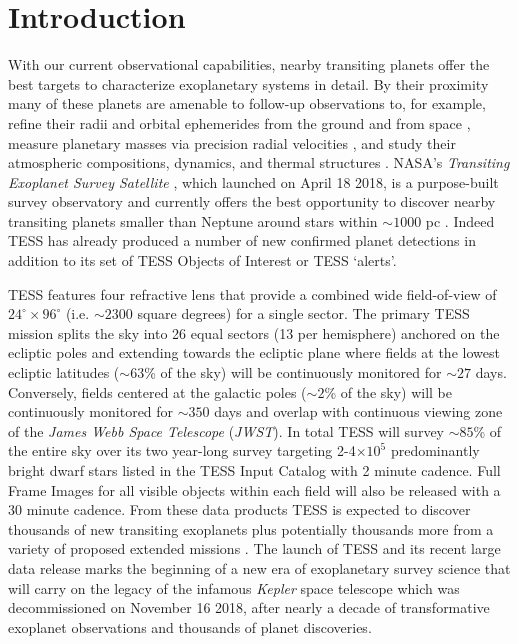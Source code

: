
\section{Introduction}
With our current observational capabilities, nearby transiting planets offer the best targets
to characterize exoplanetary systems in detail. By their proximity many of
these planets are amenable to follow-up observations to, for example, refine their radii and orbital
ephemerides from the ground \citep{stefansson17,cooke18} and from space \citep{broeg13,gaidos17},
measure planetary masses via precision radial velocities \citep{cloutier18b}, and study
their atmospheric compositions, dynamics, and thermal structures \citep{louie18,kempton18}. NASA's
\emph{Transiting Exoplanet Survey Satellite} \citep[TESS;][]{ricker15}, which launched on April 18
2018, is a purpose-built survey observatory and currently offers the best opportunity to discover
nearby transiting planets smaller than Neptune around stars within $\sim 1000$ pc \citep{stassun17}.
Indeed TESS has already produced a number of new confirmed planet detections
\citep{esposito18,gandolfi18,huang18a,trifonov18,vanderspek18} %
in addition to its set of TESS Objects of Interest or TESS `alerts'.

TESS features four refractive lens that provide a combined wide field-of-view of
$24^{\circ} \times 96^{\circ}$ (i.e. $\sim 2300$ square degrees) for a single sector. The primary
TESS mission splits the sky into 26 equal sectors (13 per hemisphere) anchored on the ecliptic
poles and extending towards the ecliptic plane where fields at the lowest ecliptic latitudes
($\sim 63$\% of the sky) will be continuously monitored for $\sim 27$ days. Conversely, fields
centered at the galactic poles ($\sim 2$\% of the sky) will be continuously monitored for
$\sim 350$ days and overlap with continuous viewing zone of the \emph{James Webb Space Telescope}
(\emph{JWST}). In total  
TESS will survey $\sim 85$\% of the entire sky over its two year-long survey targeting
2-4$\times 10^5$ predominantly bright dwarf stars listed in the TESS Input Catalog
\citep[TIC;][]{stassun17} with 2 minute cadence.
Full Frame Images for all visible objects within each field will also be released with a 30 minute
cadence. From these data products TESS
is expected to discover thousands of new transiting exoplanets 
\citep{sullivan15,ballard18,barclay18} plus potentially thousands more from a variety of proposed
extended missions \citep{bouma17,huang18b}. The launch of TESS
and its recent large data release marks the beginning of a new era of exoplanetary survey
science that will carry on the legacy of the infamous \emph{Kepler} space telescope which was
decommissioned on November 16 2018, after nearly a decade of transformative exoplanet observations
and thousands of planet discoveries.

